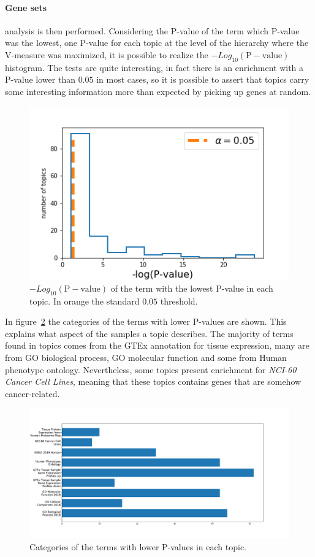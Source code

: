 \paragraph{Gene sets} analysis is then performed. Considering the P-value of the term which P-value was the lowest, one P-value for each topic at the level of the hierarchy where the V-measure was maximized, it is possible to realize the $-Log_{10}(\mathrm{P-value})$ histogram. The tests are quite interesting, in fact there is an enrichment with a P-value lower than $0.05$ in most cases, so it is possible to assert that topics carry some interesting information more than expected by picking up genes at random.
\begin{figure}[htb!]
    \centering
    \includegraphics[width=0.65\linewidth]{pictures/topic/merged/pvaluescrosstopic.png}
    \caption{$-Log_{10}(\mathrm{P-value})$ of the term with the lowest P-value in each topic. In orange the standard $0.05$ threshold.}
    \label{fig:topic/merged/pvaluescrosstopic}
\end{figure}
In figure~\ref{fig:topic/merged/pvaluecategories} the categories of the terms with lower P-values are shown. This explains what aspect of the samples a topic describes. The majority of terms found in topics comes from the GTEx annotation for tissue expression, many are from GO biological process, GO molecular function and some from Human phenotype ontology. Nevertheless, some topics present enrichment for \textit{NCI-60 Cancer Cell Lines}, meaning that these topics contains genes that are somehow cancer-related.
\begin{figure}[htb!]
    \centering
    \includegraphics[width=0.8\linewidth]{pictures/topic/merged/pvaluecategories.pdf}
    \caption{Categories of the terms with lower P-values in each topic.}
    \label{fig:topic/merged/pvaluecategories}
\end{figure}

